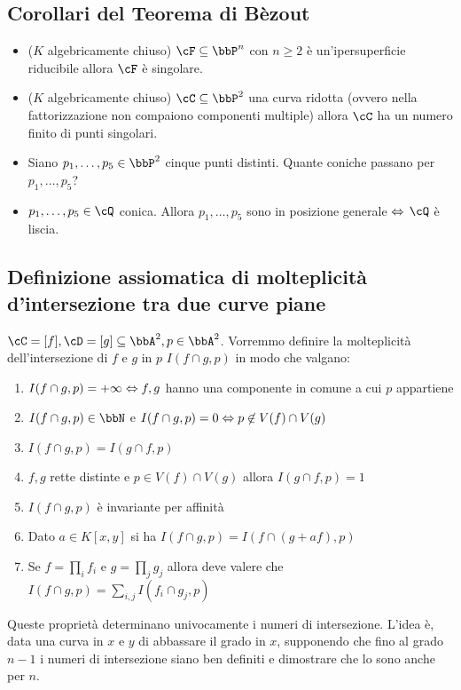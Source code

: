 \documentclass[a4paper,NoNotes,GeneralMath]{stdmdoc}
\begin{document}
	\subsection*{Corollari del Teorema di Bèzout}
	\begin{itemize}
		\item ($K$ algebricamente chiuso) $\cF \subseteq \bbP^n$ con $n \ge 2$ è un'ipersuperficie riducibile allora $\cF$ è singolare.
		\item ($K$ algebricamente chiuso) $\cC \subseteq \bbP^2$ una curva ridotta (ovvero nella fattorizzazione non compaiono componenti multiple) allora $\cC$ ha un numero finito di punti singolari.
		\item Siano $p_1, \ldots, p_5 \in \bbP^2$ cinque punti distinti. Quante coniche passano per $p_1, \ldots, p_5$?
		\item $p_1, \ldots, p_5 \in \cQ$ conica. Allora $p_1, \ldots, p_5$ sono in posizione generale $\Leftrightarrow$ $\cQ$ è liscia.
	\end{itemize}

	\subsection*{Definizione assiomatica di molteplicità d'intersezione tra due curve piane}
	$\cC = [f], \cD = [g] \subseteq \bbA^2, p \in \bbA^2$. Vorremmo definire la molteplicità dell'intersezione di $f$ e $g$ in $p$ $I(f \cap g, p)$ in modo che valgano:
	\begin{enumerate}
		\item $I(f \cap g, p) = +\infty \Leftrightarrow f,g$ hanno una componente in comune a cui $p$ appartiene
		\item $I(f \cap g, p) \in \bbN$ e $I(f \cap g, p) = 0 \Leftrightarrow p \not\in V(f) \cap V(g)$
		\item $I(f \cap g, p) = I(g \cap f, p)$
		\item $f, g$ rette distinte e $p \in V(f) \cap V(g)$ allora $I(g \cap f, p) = 1$
		\item $I(f \cap g, p)$ è invariante per affinità
		\item Dato $a \in K[x,y]$ si ha $I(f \cap g, p) = I(f \cap (g + af), p)$
		\item Se $f = \prod_i f_i$ e $g = \prod_j g_j$ allora deve valere che $I(f \cap g, p) = \sum_{i,j} I(f_i \cap g_j, p)$
	\end{enumerate}
	Queste proprietà determinano univocamente i numeri di intersezione. L'idea è, data una curva in $x$ e $y$ di abbassare il grado in $x$, supponendo che fino al grado $n-1$ i numeri di intersezione siano ben definiti e dimostrare che lo sono anche per $n$.
	
\end{document}
